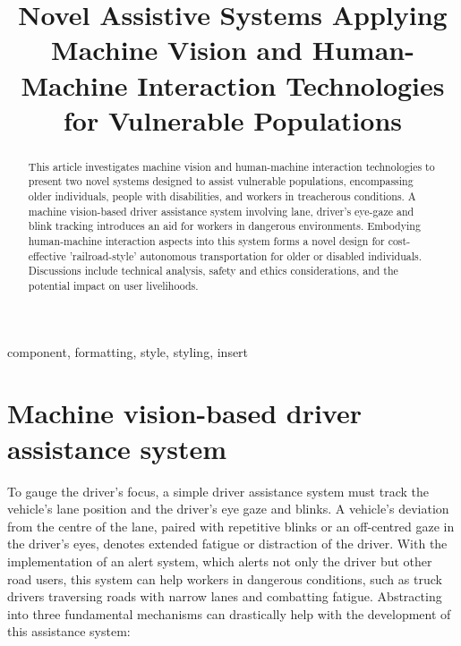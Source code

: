 \documentclass[10pt,conference]{IEEEtran}
\begin{document}
\title{Novel Assistive Systems Applying Machine Vision and Human-Machine Interaction Technologies for Vulnerable Populations}

\author{
}

\maketitle

\begin{abstract}
    This article investigates machine vision and human-machine interaction technologies to present two novel systems designed to assist vulnerable populations, encompassing older individuals, people with disabilities, and workers in treacherous conditions. A machine vision-based driver assistance system involving lane, driver's eye-gaze and blink tracking introduces an aid for workers in dangerous environments. Embodying human-machine interaction aspects into this system forms a novel design for cost-effective 'railroad-style' autonomous transportation for older or disabled individuals. Discussions include technical analysis, safety and ethics considerations, and the potential impact on user livelihoods.
\end{abstract}

\begin{IEEEkeywords}
component, formatting, style, styling, insert
\end{IEEEkeywords}

\section{Machine vision-based driver assistance system}
To gauge the driver's focus, a simple driver assistance system must track the vehicle's lane position and the driver's eye gaze and blinks. A vehicle's deviation from the centre of the lane, paired with repetitive blinks or an off-centred gaze in the driver's eyes, denotes extended fatigue or distraction of the driver. With the implementation of an alert system, which alerts not only the driver but other road users, this system can help workers in dangerous conditions, such as truck drivers traversing roads with narrow lanes and combatting fatigue. Abstracting into three fundamental mechanisms can drastically help with the development of this assistance system:
\end{document}
